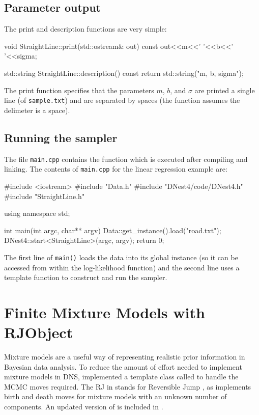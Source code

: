 \documentclass[article, nojss]{jss}
\begin{document}
\subsection{Parameter output}
The print and description functions are very simple:
\begin{CodeChunk}
\begin{CodeInput}
void StraightLine::print(std::ostream& out) const
{
    out<<m<<' '<<b<<' '<<sigma;
}

std::string StraightLine::description() const
{
    return std::string("m, b, sigma");
}
\end{CodeInput}
\end{CodeChunk}
The print function specifies that the parameters
$m$, $b$, and $\sigma$ are printed a single line
(of {\tt sample.txt}) and are separated by spaces (the
 function assumes the delimeter is a space).

\subsection{Running the sampler}
The file {\tt main.cpp} contains the  function which
is executed after compiling and linking. The contents of {\tt main.cpp}
for the linear regression example are:

\begin{CodeChunk}
\begin{CodeInput}
#include <iostream>
#include "Data.h"
#include "DNest4/code/DNest4.h"
#include "StraightLine.h"

using namespace std;

int main(int argc, char** argv)
{
    Data::get_instance().load("road.txt");
    DNest4::start<StraightLine>(argc, argv);
    return 0;
}
\end{CodeInput}
\end{CodeChunk}


The first line of {\tt main()} loads the data into its global instance
(so it can be accessed from within the log-likelihood function)
and the second line uses a  template function to construct
and run the sampler.

\section{Finite Mixture Models with RJObject}
Mixture models are a useful way of representing realistic prior information
in Bayesian data analysis. To reduce the amount of effort needed to
implement mixture models in DNS, \citet{brewer2014inference} implemented
a template class called  to handle the MCMC moves
required. The RJ in  stands for Reversible Jump
\citep{green1995reversible}, as
 implements birth and death moves for mixture
models with an unknown number of components. An updated version of
 is included in .
\end{document}

